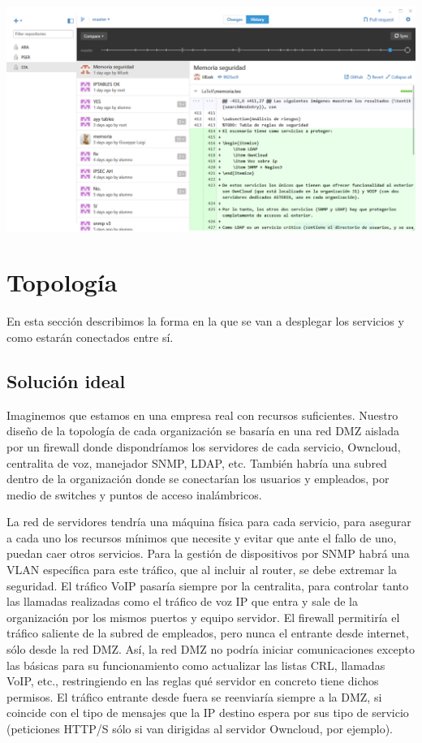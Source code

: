 \documentclass[]{article}
\begin{document}
\begin{center}
	\includegraphics[scale=0.5]{images/git.PNG}
\end{center}


\section{Topología}

En esta sección describimos la forma en la que se van a desplegar los servicios y como estarán
conectados entre sí.

\subsection{Solución ideal}

Imaginemos que estamos en una empresa real con recursos suficientes. Nuestro diseño de la topología de cada organización se basaría en una red DMZ aislada por un firewall donde dispondríamos los servidores de cada servicio, Owncloud, centralita de voz, manejador SNMP, LDAP, etc. También habría una subred dentro de la organización donde se conectarían los usuarios y empleados, por medio de switches y puntos de acceso inalámbricos.

La red de servidores tendría una máquina física para cada servicio, para asegurar a cada uno los recursos mínimos que necesite y evitar que ante el fallo de uno, puedan caer otros servicios. Para la gestión de dispositivos por SNMP habrá una VLAN específica para este tráfico, que al incluir al router, se debe extremar la seguridad. El tráfico VoIP pasaría siempre por la centralita, para controlar tanto las llamadas realizadas como el tráfico de voz IP que entra y sale de la organización por los mismos puertos y equipo servidor. El firewall permitiría el tráfico saliente de la subred de empleados, pero nunca el entrante desde internet, sólo desde la red DMZ. Así, la red DMZ no podría iniciar comunicaciones excepto las básicas para su funcionamiento como actualizar las listas CRL, llamadas VoIP, etc., restringiendo en las reglas qué servidor en concreto tiene dichos permisos. El tráfico entrante desde fuera se reenviaría siempre a la DMZ, si coincide con el tipo de mensajes que la IP destino espera por sus tipo de servicio (peticiones HTTP/S sólo si van dirigidas al servidor Owncloud, por ejemplo).
\end{document}
